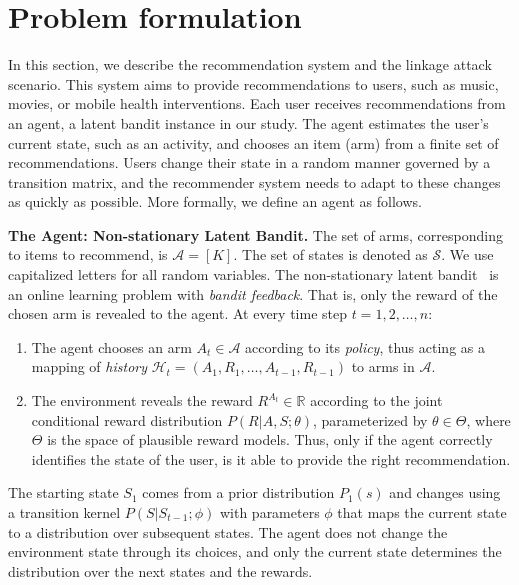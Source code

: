 \documentclass{article}
\begin{document}
\section{Problem formulation}
In this section, we describe the recommendation system and the linkage attack scenario. This system aims to provide recommendations to users, such as music, movies, or mobile health interventions. Each user receives recommendations from an agent, a latent bandit instance in our study. The agent estimates the user's current state, such as an activity, and chooses an item (arm) from a finite set of recommendations. Users change their state in a random manner governed by a transition matrix, and the recommender system needs to adapt to these changes as quickly as possible. More formally, we define an agent as follows. %

\textbf{The Agent: Non-stationary Latent Bandit.} %
The set of arms, corresponding to items to recommend, is $\mathcal{A} = \left[K\right]$. The set of states is denoted as $\mathcal{S}$. We use capitalized letters for all random variables. The non-stationary latent bandit~\citep{Hong2020} is an online learning problem with \textit{bandit feedback}. That is, only the reward of the chosen arm is revealed to the agent. At every time step $t = 1, 2 , \dots, n$:

\begin{enumerate}%
    \item The agent chooses an arm $A_t \in \mathcal{A}$ according to its \textit{policy}, thus acting as a mapping of \textit{history} $\mathcal{H}_t = (A_1, R_1,\dots, A_{t-1}, R_{t-1})$ to arms in $\mathcal{A}$. 
    \item The environment reveals the reward $R^{A_t} \in \mathbb{R}$ according to the joint conditional reward distribution $P(R | A, S; \theta)$, parameterized by $\theta \in \Theta$, where $\Theta$ is the space of plausible reward models. Thus, only if the agent correctly identifies the state of the user, is it able to provide the right recommendation.
\end{enumerate}

The starting state $S_1$ comes from a prior distribution $P_1(s)$ and changes using a transition kernel $P(S|S_{t-1};\phi)$ with parameters $\phi$ that maps the current state to a distribution over subsequent states. The agent does not change the environment state through its choices, and only the current state determines the distribution over the next states and the rewards.
\end{document}
